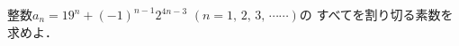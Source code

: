 \documentclass[../../main.tex]{subfiles}
\begin{document}
整数$a_n={19}^n+{(-1)}^{n-1}2^{4n-3}$ $(n=1, \, 2, \, 3, \, \cdots\cdots)$の
すべてを割り切る素数を求めよ．
\end{document}
